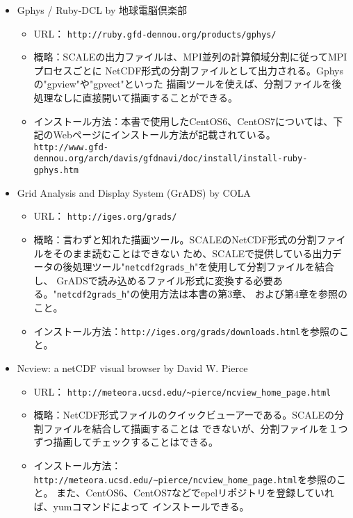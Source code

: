 \begin{itemize}
\item Gphys / Ruby-DCL by 地球電脳倶楽部\\
 \begin{itemize}
  \item URL： \verb|http://ruby.gfd-dennou.org/products/gphys/|
  \item 概略：SCALEの出力ファイルは、MPI並列の計算領域分割に従ってMPIプロセスごとに
              NetCDF形式の分割ファイルとして出力される。Gphysの"gpview"や"gpvect"といった
              描画ツールを使えば、分割ファイルを後処理なしに直接開いて描画することができる。
  \item インストール方法：本書で使用したCentOS6、CentOS7については、下記のWebページにインストール方法が記載されている。\\
                         \verb|http://www.gfd-dennou.org/arch/davis/gfdnavi/doc/install/install-ruby-gphys.htm|
 \end{itemize}
\item Grid Analysis and Display System (GrADS) by COLA\\
 \begin{itemize}
  \item URL： \verb|http://iges.org/grads/|
  \item 概略：言わずと知れた描画ツール。SCALEのNetCDF形式の分割ファイルをそのまま読むことはできない
             ため、SCALEで提供している出力データの後処理ツール"\verb|netcdf2grads_h|"を使用して分割ファイルを結合し、
             GrADSで読み込めるファイル形式に変換する必要ある。"\verb|netcdf2grads_h|"の使用方法は本書の第3章、
             および第4章を参照のこと。
  \item インストール方法：\verb|http://iges.org/grads/downloads.html|を参照のこと。
 \end{itemize}
\item Ncview: a netCDF visual browser by David W. Pierce\\
 \begin{itemize}
  \item URL： \verb|http://meteora.ucsd.edu/~pierce/ncview_home_page.html|
  \item 概略：NetCDF形式ファイルのクイックビューアーである。SCALEの分割ファイルを結合して描画することは
             できないが、分割ファイルを１つずつ描画してチェックすることはできる。
  \item インストール方法：\verb|http://meteora.ucsd.edu/~pierce/ncview_home_page.html|を参照のこと。
                        また、CentOS6、CentOS7などでepelリポジトリを登録していれば、yumコマンドによって
                        インストールできる。
 \end{itemize}
\end{itemize}





